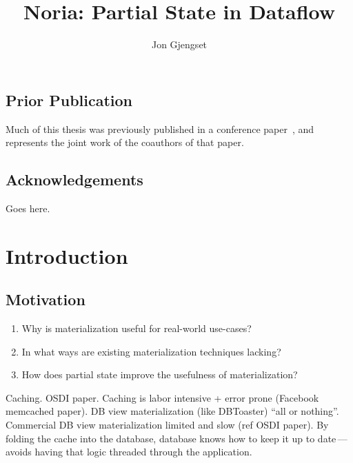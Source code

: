 \documentclass[fontsize=12pt,paper=letter,draft=true]{scrbook}
\title{Noria: Partial State in Dataflow}
\author{Jon Gjengset}
\let\mainmatterorig\mainmatter
\renewcommand\mainmatter
 {\edef\p{\arabic{page}}%
  \mainmatterorig
  \setcounter{page}{\p+1+(\p-\p/2*2)}%
 }
\begin{document}
\frontmatter



\leavevmode\thispagestyle{empty}\newpage %


\leavevmode\thispagestyle{empty}\newpage %

\section*{Prior Publication}
Much of this thesis was previously published in a conference paper~\cite{noria},
and represents the joint work of the coauthors of that paper.
\newpage

\section*{Acknowledgements}
\begin{spacing}{1}
  Goes here.
\end{spacing}

\tableofcontents

\mainmatter

\chapter{Introduction}

\section{Motivation}

\begin{enumerate}
 \item Why is materialization useful for real-world use-cases?
 \item In what ways are existing materialization techniques lacking?
 \item How does partial state improve the usefulness of materialization?
\end{enumerate}

Caching.
OSDI paper.
Caching is labor intensive + error prone (Facebook memcached paper).
DB view materialization (like DBToaster) ``all or nothing''.
Commercial DB view materialization limited and slow (ref OSDI paper).
By folding the cache into the database, database knows how to keep it up
to date\,---\,avoids having that logic threaded through the application.
\end{document}
